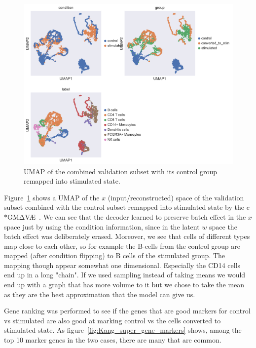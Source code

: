 \documentclass[11pt, a4paper]{report}
\theoremstyle{plain}
\theoremstyle{definition}
\theoremstyle{remark}
\newcommand{\gmvae}{c$\ast$GM$\mathrm{\Delta}$V\AE~}
\begin{document}
\begin{figure}[h]
\centering
\includegraphics[width=1.1\textwidth]{images/Kang_super_val_umap_converted_control.png}
\caption{
UMAP of the combined validation subset with its control group remapped into
stimulated state.
}
\label{fig:Kang_super_val_umap_converted_control}
\end{figure}

Figure~\ref{fig:Kang_super_val_umap_converted_control} shows a UMAP of the $x$
(input/reconstructed) space of the validation subset combined with the control
subset remapped into stimulated state by the \gmvae. We can see that the decoder
learned to preserve batch effect in the $x$ space just by using the condition
information, since in the latent $w$ space the batch effect was deliberately
erased. Moreover, we see that cells of different types map close to each other,
so for example the B-cells from the control group are mapped (after condition
flipping) to B cells of the stimulated group.
The mapping though appear somewhat one dimensional. Especially the CD14 cells
end up in a long "chain". If we used sampling instead of taking means we would
end up with a graph that has more volume to it but we chose to take the mean as
they are the best approximation that the model can give us.

Gene ranking was performed to see if the genes that are good markers for control
vs stimulated are also good at marking control vs the cells converted to
stimulated state. As figure~\ref{fig:Kang_super_gene_markers} shows, among the
top 10 marker genes in the two cases, there are many that are common.
\end{document}
